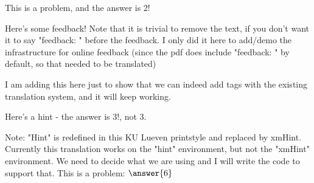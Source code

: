 \documentclass{ximera}
\begin{document}
        \begin{question}
            This is a problem, and the answer is 2! %
            \begin{selectAll}
            \end{selectAll}%
            \begin{feedback}
                Here's some feedback! Note that it is trivial to remove the text, if you don't want it to say "feedback: " before the feedback. I only did it here to add/demo the infrastructure for online feedback (since the pdf does include "feedback: " by default, so that needed to be translated)%
            \end{feedback}
            \begin{feedback}[correct]
                I am adding this here just to show that we can indeed add tags with the existing translation system, and it will keep working.%
            \end{feedback}
        \end{question}
            
        \begin{exercise}
            \begin{hint}
                Here's a hint - the answer is 3!, not 3.
            \end{hint}
            Note: "Hint" is redefined in this KU Lueven printstyle and replaced by xmHint. Currently this translation works on the "hint" environment, but not the "xmHint" environment. We need to decide what we are using and I will write the code to support that.
            This is a problem: $\answer{6}$
        \end{exercise}
            
\end{document}
